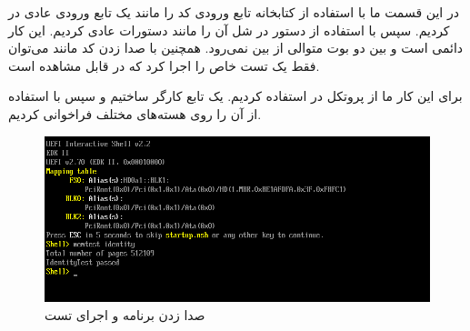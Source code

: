 


در این قسمت ما با استفاده از کتابخانه  تابع ورودی کد را مانند یک تابع ورودی عادی در  کردیم. سپس با استفاده از دستور  در شل آن را مانند دستورات عادی کردیم. این کار دائمی است و بین دو بوت متوالی از بین نمی‌رود. همچنین با صدا زدن کد مانند  می‌توان فقط یک تست خاص را اجرا کرد که در  قابل مشاهده است.


برای این کار ما از پروتکل  در  استفاده کردیم. یک تابع کارگر ساختیم و سپس با استفاده از  آن را روی هسته‌های مختلف فراخوانی کردیم.

\begin{figure}
	\centering
	\includegraphics[width=0.7\linewidth]{figs/impl/impl1}
	\caption{صدا زدن برنامه و اجرای تست }
	\label{fig:impl1}
\end{figure}
